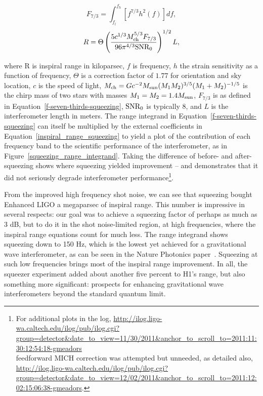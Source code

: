 \begin{equation}
F_{7/3} = \int_{f_l}^{f_h} \left[f^{7/3} h^2(f) \right] df,
\label{f-seven-thirds-squeezing}
\end{equation}
\begin{equation}
R = \Theta \left( \frac{5 c^{1/3} M_\textup{ch}^{5/3} F_{7/3}}{96 \pi^{4/3} \textup{SNR}_0} \right)^{1/2} L,
\label{inspiral_range_squeezing}
\end{equation}

\noindent where R is inspiral range in kiloparsec, $f$ is frequency, $h$ the strain sensitivity as a function of frequency, $\Theta$ is a correction factor of $1.77$ for orientation and sky location, $c$ is the speed of light, $M_\textup{ch} = G c^{-2} M_\textup{sun} (M_1 M_2)^{3/5} (M_1+M_2)^{-1/5}$ is the chirp mass of two stars with masses $M_1 = M_2 = 1.4 M_\textup{sun}$, $F_{7/3}$ is as defined in Equation~\ref{f-seven-thirds-squeezing}, $\textup{SNR}_0$ is typically 8, and $L$ is the interferometer length in meters.
The range integrand in Equation~\ref{f-seven-thirds-squeezing} can itself be multiplied by the external coefficients in Equation~\ref{inspiral_range_squeezing} to yield a plot of the contribution of each frequency band to the scientific performance of the interferometer, as in Figure~\ref{squeezing_range_integrand}.
Taking the difference of before- and after-squeezing shows where squeezing yielded improvement -- and demonstrates that it did not seriously degrade interferometer performance\footnote{For additional plots in the log, \url{http://ilog.ligo-wa.caltech.edu/ilog/pub/ilog.cgi?group=detector&date_to_view=11/30/2011&anchor_to_scroll_to=2011:11:30:12:54:18-gmeadors}\\feedforward MICH correction was attempted but unneeded, as detailed also, \url{http://ilog.ligo-wa.caltech.edu/ilog/pub/ilog.cgi?group=detector&date_to_view=12/02/2011&anchor_to_scroll_to=2011:12:02:15:06:38-gmeadors}.}.

		From the improved high frequency shot noise, we can see that squeezing bought Enhanced LIGO a megaparsec of inspiral range. 
This number is impressive in several respects: our goal was to achieve a squeezing factor of perhaps as much as 3 dB, but to do it in the shot noise-limited region, at high frequencies, where the inspiral range equations 
 count for much less. 
The range integrand shows squeezing down to 150 Hz, which is the lowest yet achieved for a gravitational wave interferometer, as can be seen in the Nature Photonics paper~\cite{BarsottiNatureSqueezing}.
Squeezing at such low frequencies brings most of the inspiral range improvement.
In all, the squeezer experiment added about another five percent to H1's range, but also something more significant: prospects for enhancing gravitational wave interferometers beyond the standard quantum limit. 

